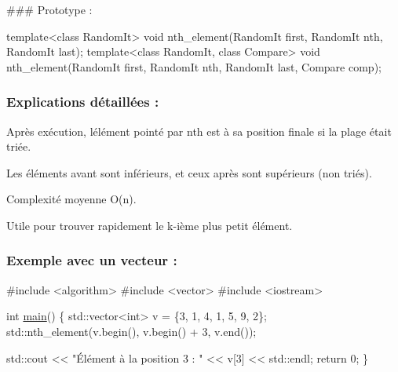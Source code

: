 \#\#\# Prototype \+: 
\begin{DoxyCode}
\textcolor{keyword}{template}<\textcolor{keyword}{class} RandomIt>
\textcolor{keywordtype}{void} nth\_element(RandomIt first, RandomIt nth, RandomIt last);
\textcolor{keyword}{template}<\textcolor{keyword}{class} RandomIt, \textcolor{keyword}{class} Compare>
\textcolor{keywordtype}{void} nth\_element(RandomIt first, RandomIt nth, RandomIt last, Compare comp);
\end{DoxyCode}


\subsubsection*{Explications détaillées \+:}


\begin{DoxyItemize}
\item Après exécution, l\textquotesingle{}élément pointé par {\ttfamily nth} est à sa position finale si la plage était triée.
\item Les éléments avant sont inférieurs, et ceux après sont supérieurs (non triés).
\item Complexité moyenne O(n).
\item Utile pour trouver rapidement le k-\/ième plus petit élément.
\end{DoxyItemize}

\subsubsection*{Exemple avec un vecteur \+:}


\begin{DoxyCode}
\textcolor{preprocessor}{#include <algorithm>}
\textcolor{preprocessor}{#include <vector>}
\textcolor{preprocessor}{#include <iostream>}

\textcolor{keywordtype}{int} \hyperlink{htop_8c_a3c04138a5bfe5d72780bb7e82a18e627}{main}() \{
    std::vector<int> v = \{3, 1, 4, 1, 5, 9, 2\};
    std::nth\_element(v.begin(), v.begin() + 3, v.end());

    std::cout << \textcolor{stringliteral}{"Élément à la position 3 : "} << v[3] << std::endl;
    \textcolor{keywordflow}{return} 0;
\}
\end{DoxyCode}
 
